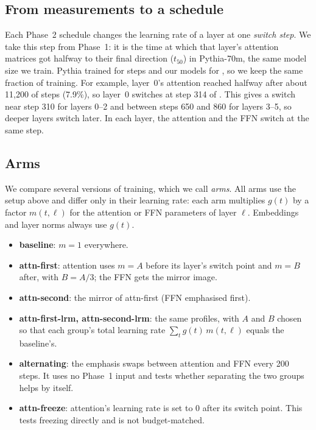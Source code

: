 \documentclass[11pt]{article}
\newcommand{\tf}{t_{50}}
\begin{document}
\subsection{From measurements to a schedule}

Each Phase~2 schedule changes the learning rate of a layer at one
\emph{switch step}. We take this step from Phase~1: it is the time at which
that layer's attention matrices got halfway to their final direction ($\tf$)
in Pythia-70m, the same model size we train. Pythia trained for
\FinalStep{} steps and our models for \PhaseTwoSteps{}, so we keep the same
fraction of training. For example, layer~0's attention reached halfway after
about 11,200 of \FinalStep{} steps (7.9\%), so layer~0 switches at step 314 of
\PhaseTwoSteps{}. This gives a switch near step 310 for layers 0--2 and
between steps 650 and 860 for layers 3--5, so deeper layers switch later.
In each layer, the attention and the FFN switch at the same step.

\subsection{Arms}\label{sec:arms}
We compare several versions of training, which we call \emph{arms}. All arms use the setup above and differ only in their
learning rate: each arm multiplies $g(t)$ by a factor $m(t,\ell)$ for the
attention or FFN parameters of layer $\ell$. Embeddings and layer norms always
use $g(t)$.

\begin{itemize}\itemsep0pt \parskip0pt
\item \textbf{baseline}: $m = 1$ everywhere.
\item \textbf{attn-first}: attention uses $m = A$ before its layer's switch
  point and $m = B$ after, with $B = A/3$; the FFN gets the mirror image.
\item \textbf{attn-second}: the mirror of attn-first (FFN emphasised first).
\item \textbf{attn-first-lrm, attn-second-lrm}: the same profiles, with $A$
  and $B$ chosen so that each group's total learning rate
  $\sum_t g(t)\,m(t,\ell)$ equals the baseline's.
\item \textbf{alternating}: the emphasis swaps between attention and FFN every
  200 steps. It uses no Phase~1 input and tests whether separating the two
  groups helps by itself.
\item \textbf{attn-freeze}: attention's learning rate is set to 0 after its
  switch point. This tests freezing directly and is not budget-matched.
\end{itemize}
\end{document}
